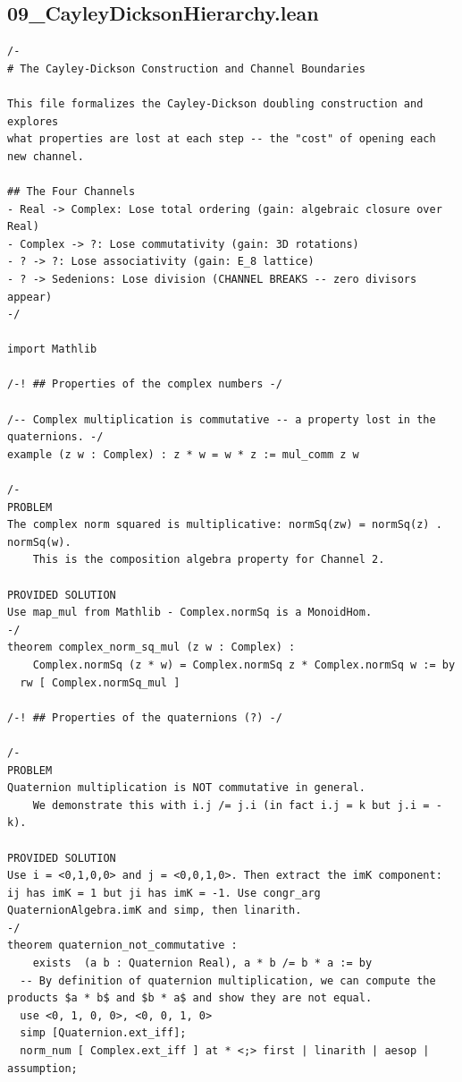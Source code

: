 \documentclass[11pt,openright,twoside]{book}
\theoremstyle{definition}
\begin{document}
\clearpage


\subsection*{09\_CayleyDicksonHierarchy.lean}
\label{lean:09_CayleyDicksonHierarchy}

\begin{lstlisting}[style=lean]
/-
# The Cayley-Dickson Construction and Channel Boundaries

This file formalizes the Cayley-Dickson doubling construction and explores
what properties are lost at each step -- the "cost" of opening each new channel.

## The Four Channels
- Real -> Complex: Lose total ordering (gain: algebraic closure over Real)
- Complex -> ?: Lose commutativity (gain: 3D rotations)
- ? -> ?: Lose associativity (gain: E_8 lattice)
- ? -> Sedenions: Lose division (CHANNEL BREAKS -- zero divisors appear)
-/

import Mathlib

/-! ## Properties of the complex numbers -/

/-- Complex multiplication is commutative -- a property lost in the quaternions. -/
example (z w : Complex) : z * w = w * z := mul_comm z w

/-
PROBLEM
The complex norm squared is multiplicative: normSq(zw) = normSq(z) . normSq(w).
    This is the composition algebra property for Channel 2.

PROVIDED SOLUTION
Use map_mul from Mathlib - Complex.normSq is a MonoidHom.
-/
theorem complex_norm_sq_mul (z w : Complex) :
    Complex.normSq (z * w) = Complex.normSq z * Complex.normSq w := by
  rw [ Complex.normSq_mul ]

/-! ## Properties of the quaternions (?) -/

/-
PROBLEM
Quaternion multiplication is NOT commutative in general.
    We demonstrate this with i.j /= j.i (in fact i.j = k but j.i = -k).

PROVIDED SOLUTION
Use i = <0,1,0,0> and j = <0,0,1,0>. Then extract the imK component: ij has imK = 1 but ji has imK = -1. Use congr_arg QuaternionAlgebra.imK and simp, then linarith.
-/
theorem quaternion_not_commutative :
    exists  (a b : Quaternion Real), a * b /= b * a := by
  -- By definition of quaternion multiplication, we can compute the products $a * b$ and $b * a$ and show they are not equal.
  use <0, 1, 0, 0>, <0, 0, 1, 0>
  simp [Quaternion.ext_iff];
  norm_num [ Complex.ext_iff ] at * <;> first | linarith | aesop | assumption;


\end{lstlisting}
\end{document}
